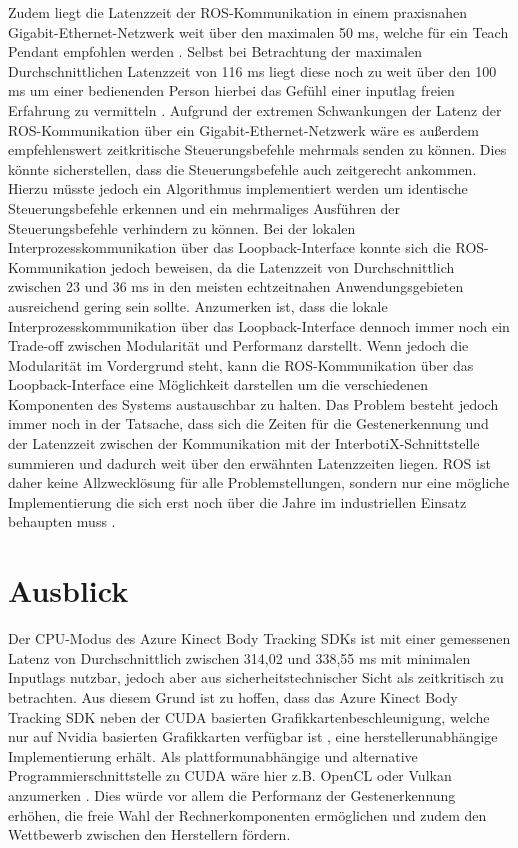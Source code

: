 Zudem liegt die Latenzzeit der ROS-Kommunikation in einem praxisnahen Gigabit-Ethernet-Netzwerk weit über den maximalen 50 ms, welche für ein Teach Pendant empfohlen werden \cite[55]{prassler_advances_2004}. Selbst bei Betrachtung der maximalen Durchschnittlichen Latenzzeit von 116 ms liegt diese noch zu weit über den 100 ms um einer bedienenden Person hierbei das Gefühl einer inputlag freien Erfahrung zu vermitteln \cite{miller_response_1968}. Aufgrund der extremen Schwankungen der Latenz der ROS-Kommunikation über ein Gigabit-Ethernet-Netzwerk wäre es außerdem empfehlenswert zeitkritische Steuerungsbefehle mehrmals senden zu können. Dies könnte sicherstellen, dass die Steuerungsbefehle auch zeitgerecht ankommen. Hierzu müsste jedoch ein Algorithmus implementiert werden um identische Steuerungsbefehle erkennen und ein mehrmaliges Ausführen der Steuerungsbefehle verhindern zu können. Bei der lokalen Interprozesskommunikation über das Loopback-Interface konnte sich die ROS-Kommunikation jedoch beweisen, da die Latenzzeit von Durchschnittlich zwischen 23 und 36 ms in den meisten echtzeitnahen Anwendungsgebieten ausreichend gering sein sollte. Anzumerken ist, dass die lokale Interprozesskommunikation über das Loopback-Interface dennoch immer noch ein Trade-off zwischen Modularität und Performanz darstellt. Wenn jedoch die Modularität im Vordergrund steht, kann die ROS-Kommunikation über das Loopback-Interface eine Möglichkeit darstellen um die verschiedenen Komponenten des Systems austauschbar zu halten. Das Problem besteht jedoch immer noch in der Tatsache, dass sich die Zeiten für die Gestenerkennung und der Latenzzeit zwischen der Kommunikation mit der InterbotiX-Schnittstelle summieren und dadurch weit über den erwähnten Latenzzeiten liegen. ROS ist daher keine Allzwecklösung für alle Problemstellungen, sondern nur eine mögliche Implementierung die sich erst noch über die Jahre im industriellen Einsatz behaupten muss \cite{why_dont_we_use_ros_nodate}.

\section{Ausblick}
Der CPU-Modus des Azure Kinect Body Tracking SDKs ist mit einer gemessenen Latenz von Durchschnittlich zwischen 314,02 und 338,55 ms mit minimalen Inputlags nutzbar, jedoch aber aus sicherheitstechnischer Sicht als zeitkritisch zu betrachten. Aus diesem Grund ist zu hoffen, dass das Azure Kinect Body Tracking SDK neben der CUDA basierten Grafikkartenbeschleunigung, welche nur auf Nvidia basierten Grafikkarten verfügbar ist \cite{encausse_body_nodate}, eine herstellerunabhängige Implementierung erhält. Als plattformunabhängige und alternative Programmierschnittstelle zu CUDA wäre hier z.B. OpenCL oder Vulkan anzumerken \cite{vulkan_api_2020}. Dies würde vor allem die Performanz der Gestenerkennung erhöhen, die freie Wahl der Rechnerkomponenten ermöglichen und zudem den Wettbewerb zwischen den Herstellern fördern.\\

